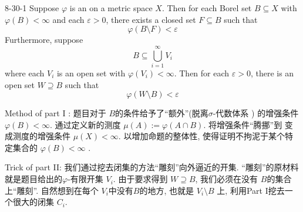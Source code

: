 \documentclass[../main.tex]{subfiles}
\begin{document}
\begin{theorem}{}{8-30-1}
    Suppose \(   \varphi   \) is an   on a  metric space \(  X  \). Then for each Borel set \(  B\subseteq X  \) with \(   \varphi \left( B \right)< \infty   \) and each \(   \varepsilon > 0  \), there exists a closed set \(  F\subseteq B  \) such that \[
     \varphi \left( B\setminus F \right)<  \varepsilon  
    \]      Furthermore, suppose \[
    B\subseteq \bigcup _{i= 1}^{\infty}V_{i}
    \]where each \(  V_{i}  \) is an open set with \(   \varphi \left( V_{i} \right)< \infty   \). Then for each \(   \varepsilon > 0  \), there is an open set \(  W\supseteq B  \) such that \[
     \varphi \left( W\setminus B \right)<  \varepsilon  
    \]    
\end{theorem}
\begin{note}
   Method of part I : 题目对于 \(  B  \)的条件给予了``额外''(脱离\(   \sigma   \)-代数体系 ) 的增强条件 \(   \varphi \left( B \right)< \infty   \). 通过定义新的测度 \(  \mu \left( A \right):=  \varphi \left( A\cap B \right)    \). 将增强条件``腾挪''到 变成测度的增强条件 \(  \mu \left( X \right)< \infty   \). 以增加命题的整体性, 使得证明不拘泥于某个特定集合的 \(   \varphi \left( B \right)< \infty   \) .

   Trick of part II: 我们通过挖去闭集的方法``雕刻''向外逼近的开集. ``雕刻''的原材料就是题目给出的\(   \varphi   \)-有限开集  \( V_{i}  \). 由于要求得到 \(  W\supseteq B  \), 我们必须在没有 \(  B  \)的集合上``雕刻''. 自然想到在每个 \(  V_{i}  \)中没有\(  B  \)的地方, 也就是 \(  V_{i}\setminus B  \)      上, 利用Part I挖去一个很大的闭集 \(  C_{i}  \). 
\end{note}
\end{document}
